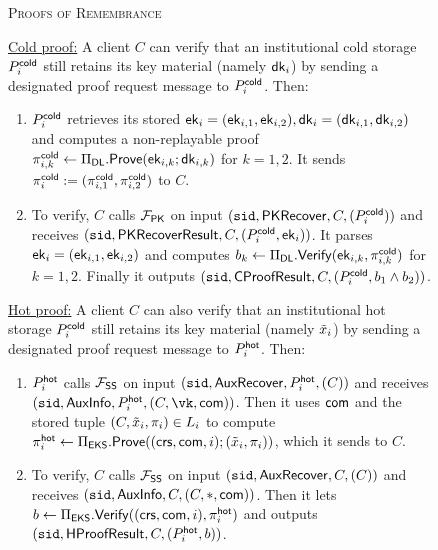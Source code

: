 \begin{figure*}
        \centering
        \begin{mdframed}
        \begin{center}
            \textsc{Proofs of Remembrance}
        \end{center}
        \underline{Cold proof:} A client $C$ can verify that an institutional cold storage $P_i^{\mathsf{cold}}$ still retains its key material (namely $\mathsf{dk}_i$) by sending a designated proof request message to $P_i^{\mathsf{cold}}$. Then:
        \begin{enumerate}
            \item $P_i^{\mathsf{cold}}$ retrieves its stored $\mathsf{ek}_i = (\mathsf{ek}_{i,1}, \mathsf{ek}_{i,2}), \mathsf{dk}_i = (\mathsf{dk}_{i,1}, \mathsf{dk}_{i,2})$ and computes a non-replayable proof $\pi_{i,k}^{\mathsf{cold}} \gets \Pi_{\sf DL}.\mathsf{Prove}(\mathsf{ek}_{i,k}; \mathsf{dk}_{i,k})$ for $k=1,2$. It sends $\pi_i^{\mathsf{cold}} := (\pi_{i,1}^{\mathsf{cold}}, \pi_{i,2}^{\mathsf{cold}})$ to $C$.
            \item To verify, $C$ calls $\mathcal{F}_\mathsf{PK}$ on input $(\texttt{sid}, \mathsf{PKRecover}, C, (P_i^{\mathsf{cold}}))$ and receives $(\texttt{sid}, \mathsf{PKRecoverResult}, C, (P_i^{\mathsf{cold}}, \mathsf{ek}_i))$. It parses $\mathsf{ek}_i = (\mathsf{ek}_{i,1},\allowbreak \mathsf{ek}_{i,2})$ and computes $b_k \gets \Pi_{\sf DL}.\mathsf{Verify}(\mathsf{ek}_{i,k}, \pi_{i,k}^{\mathsf{cold}})$ for $k=1,2$. Finally it outputs $(\texttt{sid}, \mathsf{CProofResult}, C, (P_i^{\mathsf{cold}}, b_1 \land b_2))$.
        \end{enumerate}
        \underline{Hot proof:} A client $C$ can also verify that an institutional hot storage $P_i^{\mathsf{cold}}$ still retains its key material (namely $\tilde{x}_i$) by sending a designated proof request message to $P_i^{\mathsf{hot}}$. Then:
        \begin{enumerate}
            \item $P_i^{\mathsf{hot}}$ calls $\mathcal{F}_\mathsf{SS}$ on input $(\texttt{sid}, \mathsf{AuxRecover}, P_i^{\mathsf{hot}}, (C))$ and receives $(\sid, \mathsf{AuxInfo}, P_i^\hot, (C, \vk, \com))$. Then it uses $\mathsf{com}$ and the stored tuple $(C, \tilde{x}_i, \pi_i) \in L_i$ to compute $\pi_i^{\mathsf{hot}} \gets \Pi_{\sf EKS}.\mathsf{Prove}((\mathsf{crs}, \mathsf{com}, i);\allowbreak (\tilde{x}_i, \pi_i))$, which it sends to $C$.
            \item To verify, $C$ calls $\mathcal{F}_\mathsf{SS}$ on input $(\texttt{sid}, \mathsf{AuxRecover}, C, (C))$ and receives $(\texttt{sid}, \mathsf{AuxInfo}, C, (C, *, \mathsf{com}))$. Then it lets $b \gets \Pi_{\sf EKS}.\mathsf{Verify}((\mathsf{crs}, \mathsf{com},\allowbreak i), \pi_i^{\mathsf{hot}})$ and outputs $(\texttt{sid}, \mathsf{HProofResult}, C, (P_i^{\mathsf{hot}}, b))$.

\end{enumerate}
\end{mdframed}
\end{figure*}
